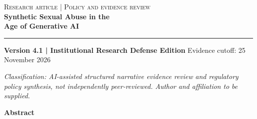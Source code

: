 \documentclass[10pt,a4paper]{article}
\begin{document}
\thispagestyle{empty}
{\large\textsc{Research article | Policy and evidence review}}\\[8mm]
{\color{ink}\fontsize{25}{29}\selectfont\bfseries Synthetic Sexual Abuse in the\\Age of Generative AI}\par
\vspace{3mm}{\Large Evidence of harm, accountability gaps, and the case\\for targeted prohibition and release controls}\par
\vspace{4mm}\rule{\linewidth}{0.8pt}\par
\textbf{Version 4.1 | Institutional Research Defense Edition} \hfill Evidence cutoff: 25 November 2026\par
\textit{Classification: AI-assisted structured narrative evidence review and regulatory policy synthesis, not independently peer-reviewed. Author and affiliation to be supplied.}\par
\vspace{3mm}\textbf{Abstract}\par
\end{document}
